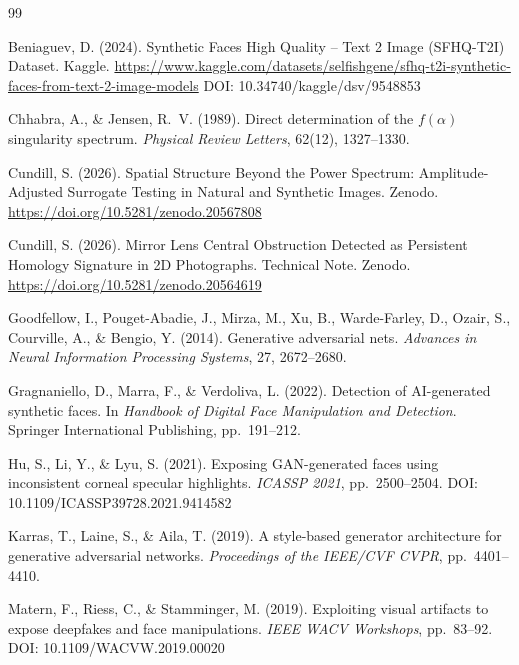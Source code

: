 \documentclass[11pt,a4paper]{article}
\begin{document}
\begin{thebibliography}{99}

Beniaguev, D. (2024).
\newblock Synthetic Faces High Quality -- Text 2 Image (SFHQ-T2I) Dataset.
\newblock Kaggle. \url{https://www.kaggle.com/datasets/selfishgene/sfhq-t2i-synthetic-faces-from-text-2-image-models}
\newblock DOI: 10.34740/kaggle/dsv/9548853

Chhabra, A., \& Jensen, R.~V. (1989).
\newblock Direct determination of the $f(\alpha)$ singularity spectrum.
\newblock \textit{Physical Review Letters}, 62(12), 1327--1330.

Cundill, S. (2026).
\newblock Spatial Structure Beyond the Power Spectrum: Amplitude-Adjusted
Surrogate Testing in Natural and Synthetic Images.
\newblock Zenodo. \url{https://doi.org/10.5281/zenodo.20567808}

Cundill, S. (2026).
\newblock Mirror Lens Central Obstruction Detected as Persistent Homology
Signature in 2D Photographs.
\newblock Technical Note. Zenodo. \url{https://doi.org/10.5281/zenodo.20564619}

Goodfellow, I., Pouget-Abadie, J., Mirza, M., Xu, B., Warde-Farley, D.,
  Ozair, S., Courville, A., \& Bengio, Y. (2014).
\newblock Generative adversarial nets.
\newblock \textit{Advances in Neural Information Processing Systems}, 27,
  2672--2680.

Gragnaniello, D., Marra, F., \& Verdoliva, L. (2022).
\newblock Detection of AI-generated synthetic faces.
\newblock In \textit{Handbook of Digital Face Manipulation and Detection}.
  Springer International Publishing, pp.\ 191--212.

Hu, S., Li, Y., \& Lyu, S. (2021).
\newblock Exposing GAN-generated faces using inconsistent corneal specular
  highlights.
\newblock \textit{ICASSP 2021}, pp.\ 2500--2504.
\newblock DOI: 10.1109/ICASSP39728.2021.9414582

Karras, T., Laine, S., \& Aila, T. (2019).
\newblock A style-based generator architecture for generative adversarial
  networks.
\newblock \textit{Proceedings of the IEEE/CVF CVPR}, pp.\ 4401--4410.

Matern, F., Riess, C., \& Stamminger, M. (2019).
\newblock Exploiting visual artifacts to expose deepfakes and face
  manipulations.
\newblock \textit{IEEE WACV Workshops}, pp.\ 83--92.
\newblock DOI: 10.1109/WACVW.2019.00020


\end{thebibliography}
\end{document}
